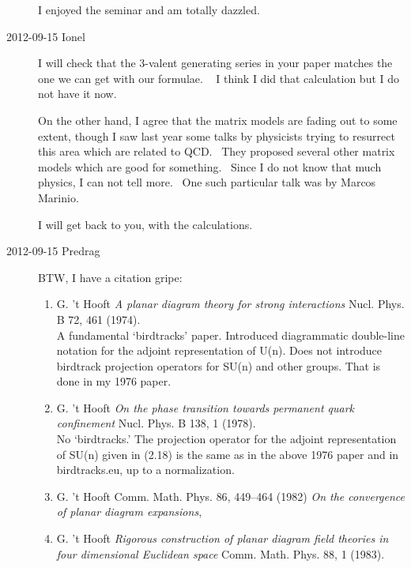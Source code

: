 \begin{description}
I enjoyed the seminar and am totally dazzled.

\item[2012-09-15 Ionel]
I will check that the 3-valent generating series in your paper matches
the one we can get with our formulae.   I think I did that calculation
but I do not have it now.

On the other hand, I agree that the matrix models are fading out to some
extent, though I saw last year some talks by physicists trying to resurrect
this area which are related to QCD.  They proposed several other matrix
models which are good for something.  Since I do not know that much
physics, I can not tell more.  One such particular talk was by Marcos
Marinio.

I will get back to you, with the calculations.

\item[2012-09-15 Predrag]
BTW, I have a citation gripe:
\begin{enumerate}

  \item
G. 't Hooft
{\emph{A planar diagram theory for strong interactions}}
Nucl. Phys. B 72, 461 (1974).\\
 A fundamental `birdtracks' paper.	Introduced diagrammatic double-line
 notation for the adjoint representation of U(n). Does not introduce
 birdtrack projection operators for SU(n) and other groups. That is done
 in my 1976 paper.

  \item
G. 't Hooft
{\emph{On the phase transition towards permanent quark confinement}}
 Nucl. Phys. B 138, 1 (1978).\\
No `birdtracks.'	The projection operator for the adjoint
representation of SU(n) given in (2.18) is the same as in the above 1976
paper and in  {birdtracks.eu}, up to
a normalization.	

  \item
G. 't Hooft
Comm. Math. Phys. {86}, {449--464} (1982)
{\emph{On the convergence of planar diagram expansions}},

  \item
 G. 't Hooft
{\emph{Rigorous construction of planar diagram field theories in four
       dimensional {Euclidean} space}}
 Comm. Math. Phys. {88}, 1 (1983). %


\end{enumerate}
\end{description}
